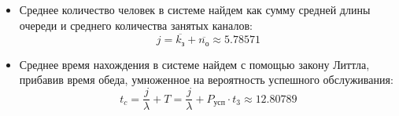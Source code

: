 \begin{itemize}
	\item Среднее количество человек в системе найдем как сумму средней длины очереди и среднего количества занятых каналов: 
	\begin{displaymath}
		j = \overline{k_\text{з}} + \overline{n_\text{о}} \approx 5.78571
	\end{displaymath}
	
	\item Среднее время нахождения в системе найдем с помощью закону Литтла, прибавив время обеда, умноженное на вероятность успешного обслуживания:
	\begin{displaymath}
		t_c = \dfrac{j}{\lambda} + T = \dfrac{j}{\lambda} + P_\text{усп} \cdot t_3 \approx 12.80789
	\end{displaymath}
\end{itemize}
	

